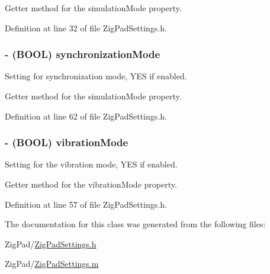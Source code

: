 Getter method for the simulationMode property. 

Definition at line 32 of file ZigPadSettings.h.

\hypertarget{interface_zig_pad_settings_a9fcf30f1031663343ce08b401c8d2a8c}{
\subsubsection[{synchronizationMode}]{\setlength{\rightskip}{0pt plus 5cm}-\/ (BOOL) synchronizationMode}}
\label{interface_zig_pad_settings_a9fcf30f1031663343ce08b401c8d2a8c}
Setting for synchronization mode, YES if enabled.

Getter method for the simulationMode property. 

Definition at line 62 of file ZigPadSettings.h.

\hypertarget{interface_zig_pad_settings_a1c931b82b4ab31532ef34774f30cb6f1}{
\subsubsection[{vibrationMode}]{\setlength{\rightskip}{0pt plus 5cm}-\/ (BOOL) vibrationMode}}
\label{interface_zig_pad_settings_a1c931b82b4ab31532ef34774f30cb6f1}
Setting for the vibration mode, YES if enabled.

Getter method for the vibrationMode property. 

Definition at line 57 of file ZigPadSettings.h.



The documentation for this class was generated from the following files:\begin{DoxyCompactItemize}
\item 
ZigPad/\hyperlink{_zig_pad_settings_8h}{ZigPadSettings.h}\item 
ZigPad/\hyperlink{_zig_pad_settings_8m}{ZigPadSettings.m}\end{DoxyCompactItemize}

